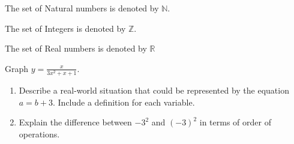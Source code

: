 \documentclass[11pt]{article}
\def\eq1{y =\frac{x}{3x^2+x+1}}
\begin{document}
The set of Natural numbers is denoted by $\mathbb{N}$.

The set of Integers is denoted by $\mathbb{Z}$.

The set of Real numbers is denoted by $\mathbb{R}$

Graph $\eq1$.

\begin{enumerate}
\item Describe a real-world situation that could be represented by the equation $a=b+3$. Include a definition for each variable.
\item Explain the difference between $-3^2$ and $(-3)^2$ in terms of order of operations.

\end{enumerate}
\end{document}
